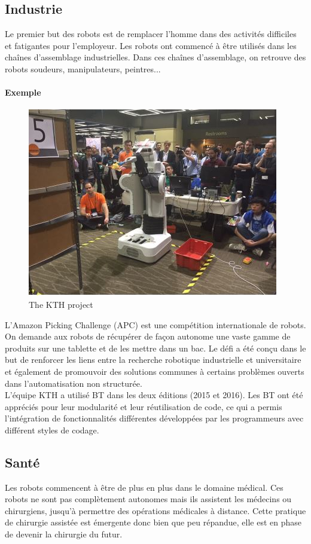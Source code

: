 \documentclass[titlepage]{article}
\begin{document}
		\subsection{Industrie}
		Le premier but des robots est de remplacer l’homme dans des activités difficiles et fatigantes pour l’employeur. Les robots ont commencé à être utilisés dans les chaînes d’assemblage industrielles. Dans ces chaînes d’assemblage, on retrouve des robots soudeurs, manipulateurs, peintres...
		\paragraph{Exemple}
		\begin{figure}[h!]
			\includegraphics[width=\linewidth]{img/robotAma.JPG}
			\caption{The KTH project}
			\label{fig:civil}
		\end{figure}
		L’Amazon Picking Challenge (APC) \cite{apc} est une compétition internationale de robots.
		On demande aux robots de récupérer de façon autonome une vaste gamme de produits sur une tablette et de les mettre dans un bac. Le défi a été conçu dans le but de renforcer les liens entre la recherche robotique industrielle et universitaire et également de promouvoir des solutions communes à certains problèmes ouverts dans l’automatisation non structurée.
		\\
		L'équipe KTH a utilisé BT dans les deux éditions (2015 et
		2016). Les BT ont été appréciés pour leur modularité et leur réutilisation de code, ce qui a permis l’intégration de fonctionnalités différentes développées par les programmeurs avec différent styles de codage.
		\subsection{Santé}
		Les robots commencent à être de plus en plus dans le domaine médical. Ces robots ne sont pas complètement autonomes mais ils assistent les médecins ou chirurgiens, jusqu'à permettre des opérations médicales à distance.  Cette pratique de chirurgie assistée est émergente donc bien que peu répandue, elle est en phase de devenir la chirurgie du futur.
		
\end{document}
